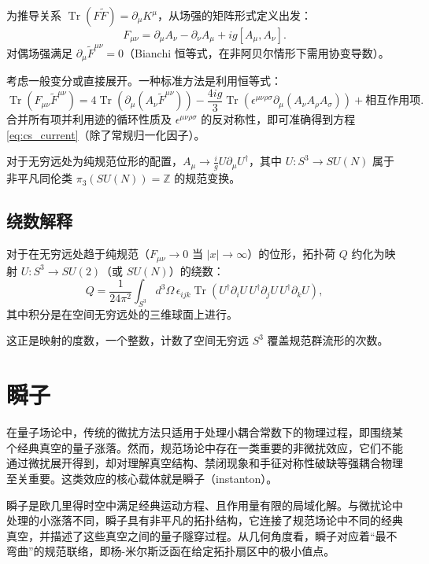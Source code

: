 为推导关系 \(\operatorname{Tr}(F \tilde{F}) = \partial_\mu K^\mu\)，从场强的矩阵形式定义出发：
\[
F_{\mu\nu} = \partial_\mu A_\nu - \partial_\nu A_\mu + ig [A_\mu, A_\nu].
\]
对偶场强满足 \(\partial_\mu \tilde{F}^{\mu\nu} = 0\)（Bianchi 恒等式，在非阿贝尔情形下需用协变导数）。

考虑一般变分或直接展开。一种标准方法是利用恒等式：
\[
\operatorname{Tr}(F_{\mu\nu} \tilde{F}^{\mu\nu}) = 4 \operatorname{Tr} \left( \partial_\mu \left( A_\nu \tilde{F}^{\mu\nu} \right) \right) - \frac{4ig}{3} \operatorname{Tr} \left( \epsilon^{\mu\nu\rho\sigma} \partial_\mu (A_\nu A_\rho A_\sigma) \right) + \text{相互作用项}.
\]
合并所有项并利用迹的循环性质及 \(\epsilon^{\mu\nu\rho\sigma}\) 的反对称性，即可准确得到方程 \eqref{eq:cs_current}（除了常规归一化因子）。

对于无穷远处为纯规范位形的配置，\(A_\mu \to \frac{i}{g} U \partial_\mu U^\dagger\)，其中 \(U: S^3 \to SU(N)\) 属于非平凡同伦类 \(\pi_3(SU(N)) = \mathbb{Z}\) 的规范变换。

\subsection*{绕数解释}

对于在无穷远处趋于纯规范（\(F_{\mu\nu} \to 0\) 当 \(|x| \to \infty\)）的位形，拓扑荷 \(Q\) 约化为映射 \(U: S^3 \to SU(2)\)（或 \(SU(N)\)）的绕数：
\begin{equation}
Q = \frac{1}{24\pi^2} \int_{S^3} d^3\Omega \, \epsilon_{ijk} \operatorname{Tr} \left( U^\dagger \partial_i U \, U^\dagger \partial_j U \, U^\dagger \partial_k U \right),
\end{equation}
其中积分是在空间无穷远处的三维球面上进行。

这正是映射的度数，一个整数，计数了空间无穷远 \(S^3\) 覆盖规范群流形的次数。


\section{瞬子}
在量子场论中，传统的微扰方法只适用于处理小耦合常数下的物理过程，即围绕某个经典真空的量子涨落。然而，规范场论中存在一类重要的非微扰效应，它们不能通过微扰展开得到，却对理解真空结构、禁闭现象和手征对称性破缺等强耦合物理至关重要。这类效应的核心载体就是瞬子（instanton）。

瞬子是欧几里得时空中满足经典运动方程、且作用量有限的局域化解。与微扰论中处理的小涨落不同，瞬子具有非平凡的拓扑结构，它连接了规范场论中不同的经典真空，并描述了这些真空之间的量子隧穿过程。从几何角度看，瞬子对应着“最不弯曲”的规范联络，即杨-米尔斯泛函在给定拓扑扇区中的极小值点。


